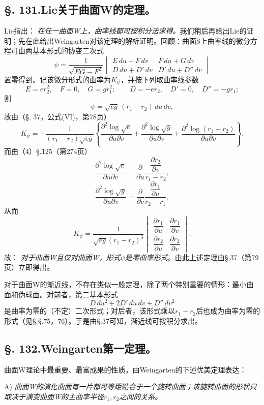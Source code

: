 \subsection*{\S. 131.\quad Lie关于曲面W的定理。}

Lie指出：
\emph{在任一曲面W上，曲率线都可按积分法求得。}我们稍后再给出Lie的证明；先在此给出Weingarten对该定理的解析证明。回顾：曲面S上曲率线的微分方程可由两基本形式的协变二次式
\[
 \psi=\frac1{\sqrt{EG-F^2}}
 \begin{vmatrix}
 E\,du+F\,dv & F\,du+G\,dv\\
 D\,du+D'\,dv & D'\,du+D''\,dv
 \end{vmatrix}
\]
置零得到。记该微分形式的曲率为\(K_\psi\)，并按下列取曲率线参数
\[
 E=er_2^2,
 \quad F=0,
 \quad G=gr_1^2;
 \qquad
 D=-er_2,
 \quad D'=0,
 \quad D''=-gr_1;
\]
则
\[
 \psi=\sqrt{eg}\,(r_1-r_2)\,du\,dv,
\]
故由（\S. 37，公式(VI)，第78页）
\[
 K_\psi=-\frac1{(r_1-r_2)\sqrt{eg}}\left\{\frac{\partial^2\log\sqrt e}{\partial u\partial v}+\frac{\partial^2\log\sqrt g}{\partial u\partial v}+\frac{\partial^2\log(r_1-r_2)}{\partial u\partial v}\right\}.
\]
而由（4）\S.125（第274页）
\[
 \frac{\partial^2\log\sqrt e}{\partial u\partial v}=\frac\partial{\partial u}\frac{\dfrac{\partial r_2}{\partial v}}{r_1-r_2},
\]
\[
 \frac{\partial^2\log\sqrt g}{\partial u\partial v}=\frac\partial{\partial v}\frac{\dfrac{\partial r_1}{\partial u}}{r_2-r_1},
\]
从而
\[
 K_\psi=\frac1{\sqrt{eg}(r_1-r_2)^3}
 \begin{vmatrix}
 \dfrac{\partial r_1}{\partial u} & \dfrac{\partial r_1}{\partial v}\\[0.6em]
 \dfrac{\partial r_2}{\partial u} & \dfrac{\partial r_2}{\partial v}
 \end{vmatrix}.
\]
故：
\emph{对于曲面W且仅对曲面W，形式\(\psi\)是零曲率形式。}由此上述定理由\S.37（第79页）立即得出。

对于曲面W的渐近线，不存在类似一般定理，除了两个特别重要的情形：最小曲面和伪球面。对前者，第二基本形式
\[
 D\,du^2+2D'\,du\,dv+D''\,dv^2
\]
是曲率为零的（不定）二次形式；对后者，该形式乘以\(r_1-r_2\)后也成为曲率为零的形式（见\S.\S.75，76）。于是由\S.37可知，渐近线可按积分求出。

\subsection*{\S. 132.\quad Weingarten第一定理。}

曲面W理论中最重要、最富成果的性质，由Weingarten的下述优美定理表达：

A) 
\emph{曲面W的演化曲面每一片都可等距贴合于一个旋转曲面；该旋转曲面的形状只取决于演变曲面W的主曲率半径\(r_1,r_2\)之间的关系。}

